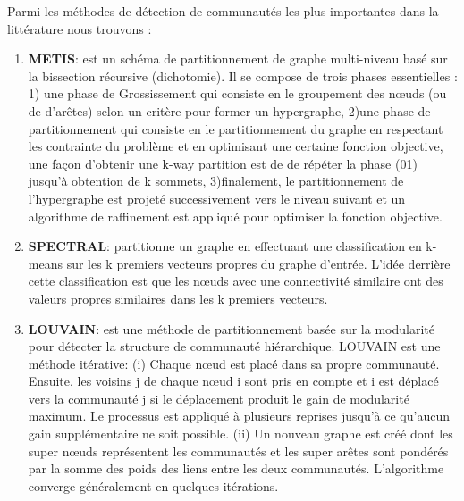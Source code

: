 			Parmi les méthodes de détection de communautés les plus importantes dans la littérature nous trouvons :
			\begin{enumerate}
				\item \textbf{METIS\citep{karypis2000multilevel}}: est un schéma de partitionnement de graphe multi-niveau basé sur la bissection récursive (dichotomie). Il se compose de trois phases essentielles : 1) une phase de Grossissement qui consiste en le groupement des nœuds (ou de d'arêtes) selon un critère pour former un hypergraphe, 2)une phase de partitionnement qui consiste en le partitionnement du graphe en respectant les contrainte du problème et en optimisant une certaine fonction objective, une façon d'obtenir une k-way partition est de de répéter la phase (01) jusqu'à obtention de k sommets, 3)finalement, le partitionnement de l'hypergraphe est projeté successivement vers le niveau suivant et un algorithme de raffinement est appliqué pour optimiser la fonction objective.
				\item \textbf{SPECTRAL\citep{hespanha2004efficient}}: partitionne un graphe en effectuant une classification en k-means sur les k premiers vecteurs propres du graphe d'entrée. L'idée derrière cette classification est que les nœuds avec une connectivité similaire ont des valeurs propres similaires dans les k premiers vecteurs.
				\item \textbf{LOUVAIN\citep{blondel2008fast}}: est une méthode de partitionnement basée sur la modularité pour détecter la structure de communauté hiérarchique. LOUVAIN est une méthode itérative: (i) Chaque nœud est placé dans sa propre communauté. Ensuite, les voisins j de chaque nœud i sont pris en compte et i est déplacé vers la communauté j si le déplacement produit le gain de modularité maximum. Le processus est appliqué à plusieurs reprises jusqu'à ce qu'aucun gain supplémentaire ne soit possible. (ii) Un nouveau graphe est créé dont les super nœuds représentent les communautés et les super arêtes sont pondérés par la somme des poids des liens entre les deux communautés. L'algorithme converge généralement en quelques itérations.

\end{enumerate}

